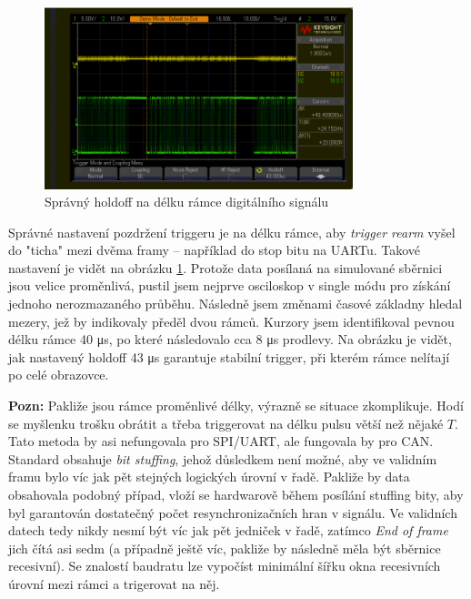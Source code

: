 \documentclass[twoside]{article}
\begin{document}
\begin{figure}[htbp]
	\centering
	\includegraphics[width=0.8\textwidth]{digital_glitch_correct_holdoff.png                    }
	\caption{Správný holdoff na délku rámce digitálního signálu}
	\label{fig:good_holdoff}
\end{figure}
Správné nastavení pozdržení triggeru je na délku rámce, aby \textit{trigger rearm} vyšel do "ticha" mezi dvěma framy -- například do stop bitu na UARTu. 
Takové nastavení je vidět na obrázku \ref{fig:good_holdoff}. Protože data posílaná na simulované sběrnici jsou velice proměnlivá, pustil jsem
nejprve osciloskop v single módu pro získání jednoho nerozmazaného průběhu.
Následně jsem změnami časové základny hledal mezery, jež by indikovaly předěl dvou rámců.
Kurzory jsem identifikoval pevnou délku rámce 40 \si{\micro\second}, po které následovalo cca 8 \si{\micro\second} prodlevy.
Na obrázku je vidět, jak nastavený holdoff 43 \si{\micro\second} garantuje stabilní trigger, při kterém rámce nelítají po celé obrazovce.

\textbf{Pozn:} Pakliže jsou rámce proměnlivé délky, výrazně se situace zkomplikuje. Hodí se myšlenku trošku obrátit a třeba triggerovat
na délku pulsu větší než nějaké $T$. Tato metoda by asi nefungovala pro SPI/UART, ale fungovala by pro CAN. Standard obsahuje \textit{bit stuffing},
jehož důsledkem není možné, aby ve validním framu bylo víc jak pět stejných logických úrovní v řadě. Pakliže by data obsahovala podobný případ,
vloží se hardwarově během posílání stuffing bity, aby byl garantován dostatečný počet resynchronizačních hran v signálu.
Ve validních datech tedy nikdy nesmí být víc jak pět jedniček v řadě, zatímco \textit{End of frame} jich čítá asi sedm
(a případně ještě víc, pakliže by následně měla být sběrnice recesivní). Se znalostí baudratu lze vypočíst minimální šířku okna recesivních úrovní
mezi rámci a trigerovat na něj.
\end{document}
